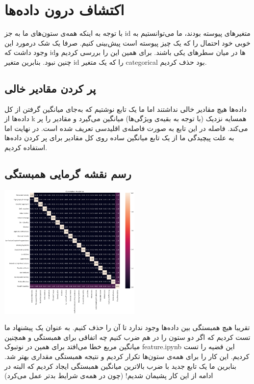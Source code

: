 \documentclass[11pt, a4paper, oneside]{book}
\begin{document}
	\section{اکتشاف درون داده‌ها}
	با توجه به اینکه همه‌ی ستون‌های ما به جز id متغیرهای پیوسته بودند، ما می‌توانستیم به خوبی خود احتمال را که یک چیز پیوسته است پیش‌بینی کنیم.
	صرفا یک شک درمورد این وجود داشت که idها در میان سطرهای یکی باشند. برای همین این را بررسی کردیم و چنین نبود. بنابرین متغیر id را که یک متغیر categorical بود حذف کردیم. 
	\subsection{پر کردن مقادیر خالی}
	داده‌ها هیچ مقادیر خالی نداشتند اما ما یک تابع
	  نوشتیم که به‌جای میانگین گرفتن از کل داده‌ها از k همسایه‌ نزدیک (با توجه به بقیه‌ی ویژگی‌ها) میانگین می‌گیرد و مقادیر را پر می‌کند. فاصله در این تابع به صورت فاصله‌ی اقلیدسی تعریف شده است.
	در نهایت اما به علت پیچیدگی ما از یک تابع میانگین ساده روی کل مقادیر برای پر کردن داده‌ها استفاده کردیم.
	\subsection{رسم نقشه گرمایی همبستگی}

	\begin{center}
		\includegraphics[width=7cm]{./images/heatmap.png}
\end{center}

	تقریبا هیچ همبستگی بین داده‌ها وجود ندارد تا آن را حذف کنیم. 
	به عنوان یک پیشنهاد ما تست کردیم که اگر دو ستون را در هم ضرب کنیم چه اتفاقی برای همبستگی و همچنین میانگین مربع خطا می‌افتد برای همین در نوتبوک feature.ipynb این قضیه را تست کردیم. این کار را برای همه‌ی ستون‌ها تکرار کردیم و نتیجه همبستگی مقداری بهتر شد. بنابرین ما یک تابع جدید با ضرب بالاترین میانگین همبستگی ایجاد کردیم که البته در ادامه از این کار پشیمان شدیم! (چون در همه‌ی شرایط بدتر عمل می‌کرد)
\end{document}
